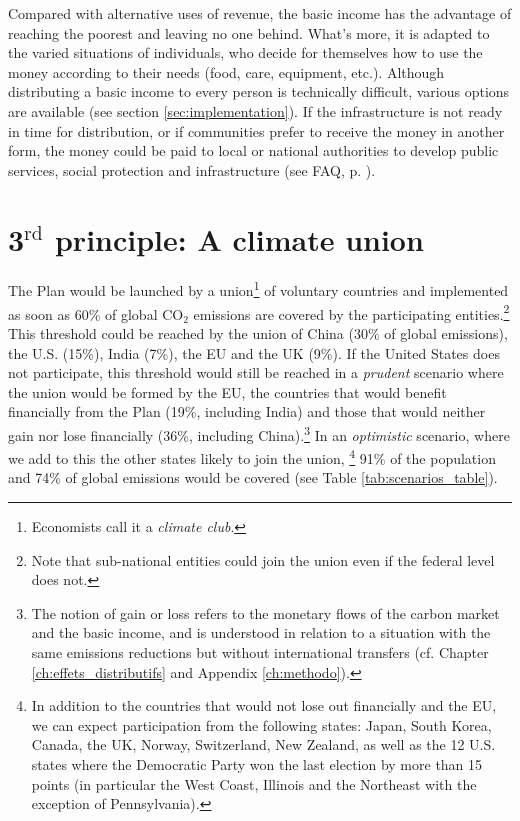 \documentclass[a5paper,english,openany]{memoir}
\begin{document}
Compared with alternative uses of revenue, the basic income has the advantage of reaching the poorest and leaving no one behind. What's more, it is adapted to the varied situations of individuals, who decide for themselves how to use the money according to their needs (food, care, equipment, etc.). 
Although distributing a basic income to every person is technically difficult, various options are available %
(see section \ref{sec:implementation}). If the infrastructure is not ready in time for distribution, or if communities prefer to receive the money in another form, the money could be paid to local or national authorities to develop public services, social protection and infrastructure (see FAQ, p. \pageref{q:rdb}). 

\section{3$^\text{rd}$ principle: A climate union}

The Plan would be launched by a union\footnote{Economists call it a \textit{climate club}.} of voluntary countries and implemented as soon as 60\% of global CO$_\text{2}$ emissions are covered by the participating entities.\footnote{Note that sub-national entities could join the union even if the federal level does not.} This threshold could be reached by the union of China (30\% of global emissions), the U.S. (15\%), India (7\%), the EU and the UK (9\%). If the United States does not participate, this threshold would still be reached in a \textit{prudent} scenario where the union would be formed by the EU, the countries that would benefit financially from the Plan (19\%, including India) and those that would neither gain nor lose financially (36\%, including China).\footnote{The notion of gain or loss refers to the monetary flows of the carbon market and the basic income, and is understood in relation to a situation with the same emissions reductions but without international transfers (cf. Chapter \ref{ch:effets_distributifs} and Appendix \ref{ch:methodo}).} %
In an \textit{optimistic} scenario, where we add to this the other states likely to join the union,%
\footnote{In addition to the countries that would not lose out financially and the EU, we can expect participation from the following states: Japan, South Korea, Canada, the UK, Norway, Switzerland, New Zealand, as well as the 12 U.S. states where the Democratic Party won the last election by more than 15 points (in particular the West Coast, Illinois and the Northeast with the exception of Pennsylvania).} 
91\% of the population and 74\% of global emissions would be covered (see Table \ref{tab:scenarios_table}). 
\end{document}
